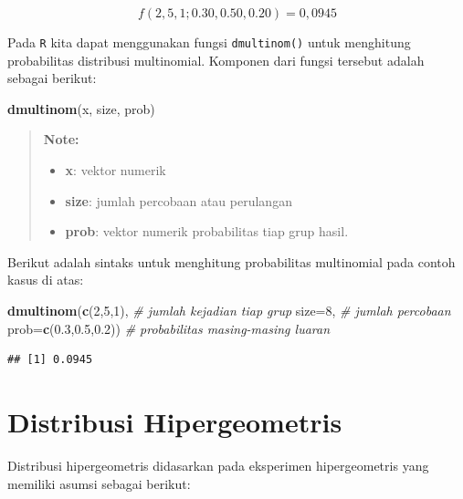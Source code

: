 \documentclass[]{book}
\newenvironment{Shaded}{\begin{snugshade}}{\end{snugshade}}
\newcommand{\KeywordTok}[1]{\textcolor[rgb]{0.13,0.29,0.53}{\textbf{#1}}}
\newcommand{\DataTypeTok}[1]{\textcolor[rgb]{0.13,0.29,0.53}{#1}}
\newcommand{\DecValTok}[1]{\textcolor[rgb]{0.00,0.00,0.81}{#1}}
\newcommand{\FloatTok}[1]{\textcolor[rgb]{0.00,0.00,0.81}{#1}}
\newcommand{\CommentTok}[1]{\textcolor[rgb]{0.56,0.35,0.01}{\textit{#1}}}
\newcommand{\NormalTok}[1]{#1}
\providecommand{\tightlist}{%
  \setlength{\itemsep}{0pt}\setlength{\parskip}{0pt}}
\begin{document}
\[
f\left(2,5,1;0.30,0.50,0.20\right)=0,0945
\]

Pada \texttt{R} kita dapat menggunakan fungsi \texttt{dmultinom()} untuk
menghitung probabilitas distribusi multinomial. Komponen dari fungsi
tersebut adalah sebagai berikut:

\begin{Shaded}
\begin{Highlighting}[]
\KeywordTok{dmultinom}\NormalTok{(x, size, prob)}
\end{Highlighting}
\end{Shaded}

\begin{quote}
\textbf{Note: }

\begin{itemize}
\tightlist
\item
  \textbf{x}: vektor numerik
\item
  \textbf{size}: jumlah percobaan atau perulangan
\item
  \textbf{prob}: vektor numerik probabilitas tiap grup hasil.
\end{itemize}
\end{quote}

Berikut adalah sintaks untuk menghitung probabilitas multinomial pada
contoh kasus di atas:

\begin{Shaded}
\begin{Highlighting}[]
\KeywordTok{dmultinom}\NormalTok{(}\KeywordTok{c}\NormalTok{(}\DecValTok{2}\NormalTok{,}\DecValTok{5}\NormalTok{,}\DecValTok{1}\NormalTok{), }\CommentTok{# jumlah kejadian tiap grup }
          \DataTypeTok{size=}\DecValTok{8}\NormalTok{, }\CommentTok{# jumlah percobaan}
          \DataTypeTok{prob=}\KeywordTok{c}\NormalTok{(}\FloatTok{0.3}\NormalTok{,}\FloatTok{0.5}\NormalTok{,}\FloatTok{0.2}\NormalTok{)) }\CommentTok{# probabilitas masing-masing luaran}
\end{Highlighting}
\end{Shaded}

\begin{verbatim}
## [1] 0.0945
\end{verbatim}

\section{Distribusi Hipergeometris}\label{distribusi-hipergeometris}

Distribusi hipergeometris didasarkan pada eksperimen hipergeometris yang
memiliki asumsi sebagai berikut:
\end{document}
